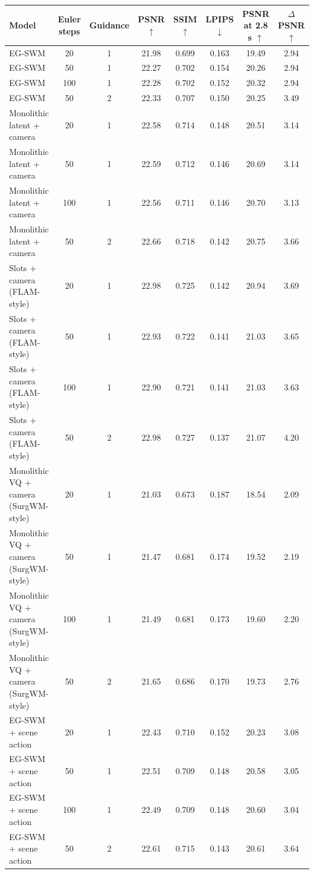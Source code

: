 \begin{tabular}{lccccccc}
\toprule
Model & Euler steps & Guidance & PSNR $\uparrow$ & SSIM $\uparrow$ & LPIPS $\downarrow$ & PSNR at 2.8 s $\uparrow$ & $\Delta$PSNR $\uparrow$ \\
\midrule
EG-SWM & 20 & 1 & 21.98 & 0.699 & 0.163 & 19.49 & 2.94 \\
EG-SWM & 50 & 1 & 22.27 & 0.702 & 0.154 & 20.26 & 2.94 \\
EG-SWM & 100 & 1 & 22.28 & 0.702 & 0.152 & 20.32 & 2.94 \\
EG-SWM & 50 & 2 & 22.33 & 0.707 & 0.150 & 20.25 & 3.49 \\
Monolithic latent + camera & 20 & 1 & 22.58 & 0.714 & 0.148 & 20.51 & 3.14 \\
Monolithic latent + camera & 50 & 1 & 22.59 & 0.712 & 0.146 & 20.69 & 3.14 \\
Monolithic latent + camera & 100 & 1 & 22.56 & 0.711 & 0.146 & 20.70 & 3.13 \\
Monolithic latent + camera & 50 & 2 & 22.66 & 0.718 & 0.142 & 20.75 & 3.66 \\
Slots + camera (FLAM-style) & 20 & 1 & 22.98 & 0.725 & 0.142 & 20.94 & 3.69 \\
Slots + camera (FLAM-style) & 50 & 1 & 22.93 & 0.722 & 0.141 & 21.03 & 3.65 \\
Slots + camera (FLAM-style) & 100 & 1 & 22.90 & 0.721 & 0.141 & 21.03 & 3.63 \\
Slots + camera (FLAM-style) & 50 & 2 & 22.98 & 0.727 & 0.137 & 21.07 & 4.20 \\
Monolithic VQ + camera (SurgWM-style) & 20 & 1 & 21.03 & 0.673 & 0.187 & 18.54 & 2.09 \\
Monolithic VQ + camera (SurgWM-style) & 50 & 1 & 21.47 & 0.681 & 0.174 & 19.52 & 2.19 \\
Monolithic VQ + camera (SurgWM-style) & 100 & 1 & 21.49 & 0.681 & 0.173 & 19.60 & 2.20 \\
Monolithic VQ + camera (SurgWM-style) & 50 & 2 & 21.65 & 0.686 & 0.170 & 19.73 & 2.76 \\
EG-SWM + scene action & 20 & 1 & 22.43 & 0.710 & 0.152 & 20.23 & 3.08 \\
EG-SWM + scene action & 50 & 1 & 22.51 & 0.709 & 0.148 & 20.58 & 3.05 \\
EG-SWM + scene action & 100 & 1 & 22.49 & 0.709 & 0.148 & 20.60 & 3.04 \\
EG-SWM + scene action & 50 & 2 & 22.61 & 0.715 & 0.143 & 20.61 & 3.64 \\
\bottomrule
\end{tabular}
